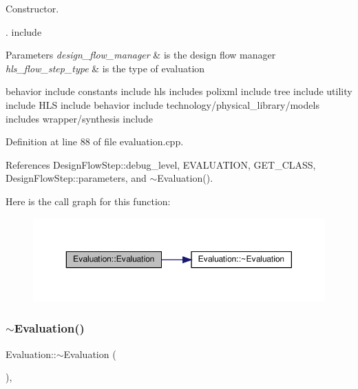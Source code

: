 Constructor. 

. include


\begin{DoxyParams}{Parameters}
{\em design\+\_\+flow\+\_\+manager} & is the design flow manager \\
\hline
{\em hls\+\_\+flow\+\_\+step\+\_\+type} & is the type of evaluation\\
\hline
\end{DoxyParams}
behavior include constants include hls includes polixml include tree include utility include H\+LS include behavior include technology/physical\+\_\+library/models includes wrapper/synthesis include 

Definition at line 88 of file evaluation.\+cpp.



References Design\+Flow\+Step\+::debug\+\_\+level, E\+V\+A\+L\+U\+A\+T\+I\+ON, G\+E\+T\+\_\+\+C\+L\+A\+SS, Design\+Flow\+Step\+::parameters, and $\sim$\+Evaluation().

Here is the call graph for this function\+:
\nopagebreak
\begin{figure}[H]
\begin{center}
\leavevmode
\includegraphics[width=350pt]{dd/d82/classEvaluation_a0496e2964ae3d73fe1a255526a8f4ee1_cgraph}
\end{center}
\end{figure}
\mbox{\label{classEvaluation_adaca340ad09e89e3c6d363d07a9c181b}} 
\subsubsection{\texorpdfstring{$\sim$\+Evaluation()}{~Evaluation()}}
{\footnotesize\ttfamily Evaluation\+::$\sim$\+Evaluation (\begin{DoxyParamCaption}{ }\end{DoxyParamCaption})\hspace{0.3cm}{\ttfamily [override]}, {\ttfamily [default]}}



